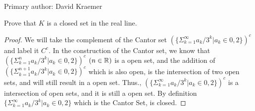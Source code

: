 Primary author: David Kraemer

\begin{majorEx}
Prove that $K$ is a closed set in the real line.
\end{majorEx}

\begin{proof}
We will take the complement of the Cantor set $(\{\Sigma_{k=1}^\infty a_k/3^k | a_k \in {0, 2}\})^c$ and label it $C^c$. In the construction of the
Cantor set, we know that $(\{\Sigma_{k=1}^n a_k/3^k | a_k \in {0, 2}\})^c$ $(n \in \mathbb{R})$ is a open set, and the addition of $(\{\Sigma_{k=1}^{n+1} a_k/3^k | a_k \in {0, 2}\})^c$ which is also open, is the intersection of two open sets, and will still result in a open set. Thus., $(\{\Sigma_{k=1}^\infty a_k/3^k | a_k \in {0, 2}\})^c$ is a intersection of open sets, and it is still a open set. By definition $\{\Sigma_{k=1}^\infty a_k/3^k | a_k \in {0, 2}\}$ which is the Cantor Set, is closed.
\end{proof}

